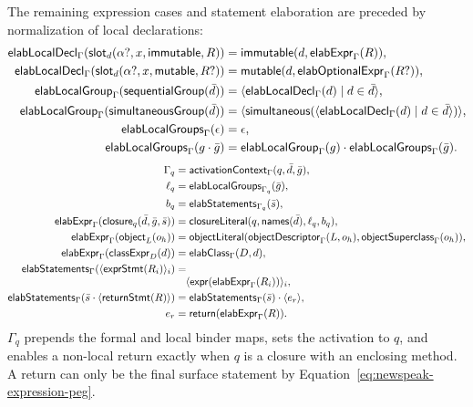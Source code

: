 The remaining expression cases and statement elaboration are
preceded by normalization of local declarations:
\begin{equation}\label{eq:local-group-elaboration}
\begin{aligned}
 \mathsf{elabLocalDecl}_{\Gamma}
  (\mathsf{slot}_{d}(\alpha?,x,\mathsf{immutable},R))
   &=\mathsf{immutable}(d,\mathsf{elabExpr}_{\Gamma}(R)),\\
 \mathsf{elabLocalDecl}_{\Gamma}
  (\mathsf{slot}_{d}(\alpha?,x,\mathsf{mutable},R?))
   &=\mathsf{mutable}(d,\mathsf{elabOptionalExpr}_{\Gamma}(R?)),\\
 \mathsf{elabLocalGroup}_{\Gamma}(\mathsf{sequentialGroup}(\bar d))
   &=\langle\mathsf{elabLocalDecl}_{\Gamma}(d)\mid d\in\bar d\rangle,\\
 \mathsf{elabLocalGroup}_{\Gamma}(\mathsf{simultaneousGroup}(\bar d))
   &=\langle\mathsf{simultaneous}
      (\langle\mathsf{elabLocalDecl}_{\Gamma}(d)\mid d\in\bar d\rangle)\rangle,\\
 \mathsf{elabLocalGroups}_{\Gamma}(\epsilon)&=\epsilon,\\
 \mathsf{elabLocalGroups}_{\Gamma}(g\cdot\bar g)&=
   \mathsf{elabLocalGroup}_{\Gamma}(g)\cdot
   \mathsf{elabLocalGroups}_{\Gamma}(\bar g).
\end{aligned}
\end{equation}
\begin{equation}\label{eq:compound-expression-elaboration}
\begin{aligned}
 \Gamma_q&=\mathsf{activationContext}_{\Gamma}(q,\bar d,\bar g),\\
 \ell_q&=\mathsf{elabLocalGroups}_{\Gamma_q}(\bar g),\\
 b_q&=\mathsf{elabStatements}_{\Gamma_q}(\bar s),\\
 \mathsf{elabExpr}_{\Gamma}(\mathsf{closure}_{q}(\bar d,\bar g,\bar s))
   &=\mathsf{closureLiteral}(q,\mathsf{names}(\bar d),\ell_q,b_q),\\
 \mathsf{elabExpr}_{\Gamma}(\mathsf{object}_{L}(o_h))
   &=\mathsf{objectLiteral}(\mathsf{objectDescriptor}_{\Gamma}(L,o_h),
       \mathsf{objectSuperclass}_{\Gamma}(o_h)),\\
 \mathsf{elabExpr}_{\Gamma}(\mathsf{classExpr}_{D}(d))
   &=\mathsf{elabClass}_{\Gamma}(D,d),\\
 \mathsf{elabStatements}_{\Gamma}
   (\langle\mathsf{exprStmt}(R_i)\rangle_i)&=\\[-1mm]
 &\quad\langle\mathsf{expr}(\mathsf{elabExpr}_{\Gamma}(R_i))\rangle_i,\\
 \mathsf{elabStatements}_{\Gamma}
   (\bar s\cdot\langle\mathsf{returnStmt}(R)\rangle)
   &=\mathsf{elabStatements}_{\Gamma}(\bar s)\cdot\langle e_r\rangle,\\
 e_r&=\mathsf{return}(\mathsf{elabExpr}_{\Gamma}(R)).
\end{aligned}
\end{equation}
$\Gamma_q$ prepends the formal and local binder maps, sets the activation to
$q$, and enables a non-local return exactly when $q$ is a closure with an
enclosing method.  A return can only be the final surface statement by
Equation~\eqref{eq:newspeak-expression-peg}.

